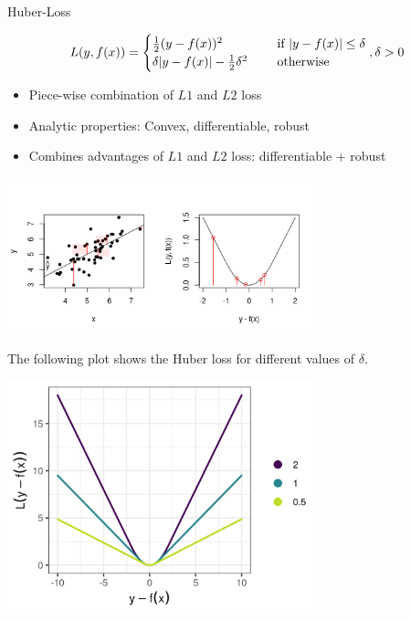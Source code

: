 \begin{vbframe}{Huber-Loss}

\vspace*{-0.3cm}

$$
L(y, f(x)) = \begin{cases}
  \frac{1}{2}(y - f(x))^2  & \text{ if } |y - f(x)| \le \delta \\
  \delta |y - f(x)|-\frac{1}{2}\delta^2 \quad & \text{ otherwise }
  \end{cases}, \delta > 0
$$

\begin{itemize}
\item Piece-wise combination of $L1$ and $L2$ loss
\item Analytic properties: Convex, differentiable, robust
\item Combines advantages of $L1$ and $L2$ loss: differentiable + robust
\end{itemize}

\vspace*{-1cm}

\begin{center}
\includegraphics[width = 9cm]{figure_man/loss_huber_plot1.png} \\
\end{center}

\framebreak

The following plot shows the Huber loss for different values of $\delta$.

\begin{center}
\includegraphics[width = 9cm]{figure_man/loss_huber_plot2.png} 
\end{center}

\end{vbframe}

